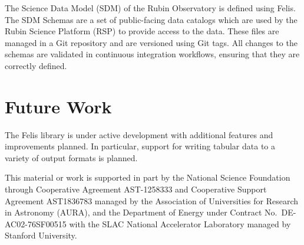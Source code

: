 \documentclass[11pt,twoside]{article}
\begin{document}
The Science Data Model (SDM) of the Rubin Observatory is defined using Felis.
The SDM Schemas are a set of public-facing data catalogs which are used by the Rubin Science Platform (RSP) to provide access to the data.
These files are managed in a Git repository and are versioned using Git tags.
All changes to the schemas are validated in continuous integration workflows, ensuring that they are correctly defined.

\section{Future Work}

The Felis library is under active development with additional features and improvements planned.
In particular, support for writing tabular data to a variety of output formats is planned.

\acknowledgments This material or work is supported in part by the National Science Foundation through Cooperative Agreement AST-1258333 and Cooperative Support Agreement AST1836783 managed by the Association of Universities for Research in Astronomy (AURA), and the Department of Energy under Contract No.\ DE-AC02-76SF00515 with the SLAC National Accelerator Laboratory managed by Stanford University.


\end{document}
